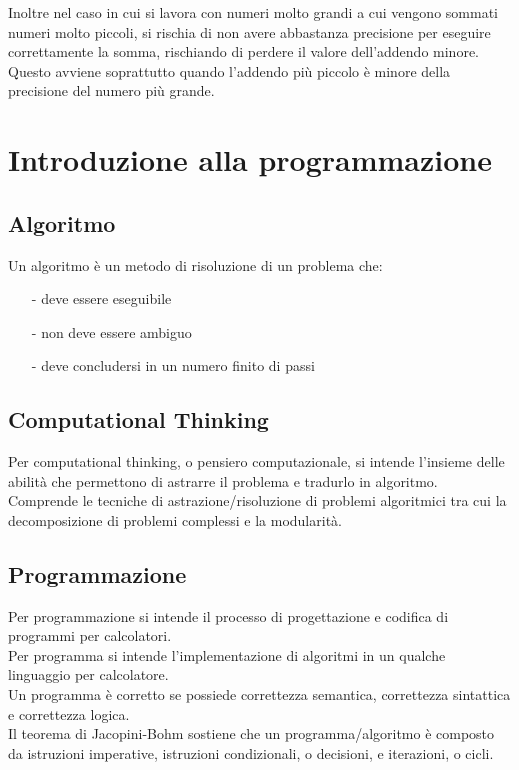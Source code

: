 \documentclass{article}
\begin{document}
Inoltre nel caso in cui si lavora con numeri molto grandi a cui vengono sommati numeri molto piccoli, si rischia di
non avere abbastanza precisione per eseguire correttamente la somma, rischiando di perdere il valore dell'addendo minore.
Questo avviene soprattutto quando l'addendo più piccolo è minore della precisione del numero più grande.

\newpage

\section{Introduzione alla programmazione}

\subsection{Algoritmo}
Un algoritmo è un metodo di risoluzione di un problema che:
\begin{itemize}[topsep=3pt, itemsep=0pt]
	\item[-] deve essere eseguibile
	\item[-] non deve essere ambiguo
	\item[-] deve concludersi in un numero finito di passi
\end{itemize}

\subsection{Computational Thinking}
Per computational thinking, o pensiero computazionale, si intende l'insieme delle abilità che permettono di astrarre
il problema e tradurlo in algoritmo. Comprende le tecniche di astrazione/risoluzione di problemi algoritmici tra
cui la decomposizione di problemi complessi e la modularità.

\subsection{Programmazione}
Per programmazione si intende il processo di progettazione e codifica di programmi per calcolatori. \\
Per programma si intende l'implementazione di algoritmi in un qualche linguaggio per calcolatore. \\
Un programma è corretto se possiede correttezza semantica, correttezza sintattica e correttezza logica. \\
Il teorema di Jacopini-Bohm sostiene che un programma/algoritmo è composto da istruzioni imperative, istruzioni condizionali,
o decisioni, e iterazioni, o cicli.
\end{document}
